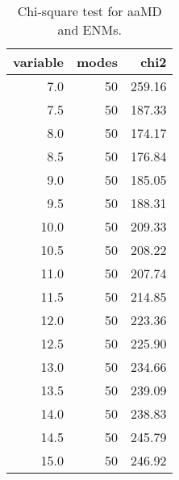 \begin{table}[center]
\centering
\caption{Chi-square test for aaMD and ENMs.}
\label{tab:chi2}
\begin{tabular}{rrr}
\toprule
 variable &  modes &   chi2 \\
\midrule
      7.0 &     50 & 259.16 \\
      7.5 &     50 & 187.33 \\
      8.0 &     50 & 174.17 \\
      8.5 &     50 & 176.84 \\
      9.0 &     50 & 185.05 \\
      9.5 &     50 & 188.31 \\
     10.0 &     50 & 209.33 \\
     10.5 &     50 & 208.22 \\
     11.0 &     50 & 207.74 \\
     11.5 &     50 & 214.85 \\
     12.0 &     50 & 223.36 \\
     12.5 &     50 & 225.90 \\
     13.0 &     50 & 234.66 \\
     13.5 &     50 & 239.09 \\
     14.0 &     50 & 238.83 \\
     14.5 &     50 & 245.79 \\
     15.0 &     50 & 246.92 \\
\bottomrule
\end{tabular}
\end{table}
